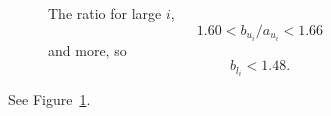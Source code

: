 \documentclass{amsart}
\begin{document}
\begin{figure}
\caption{The ratio for large $i$, $$ 1.60 < b_{u_i}/a_{u_i} < 1.66 $$ and more, so $$ b_{l_i} < 1.48.$$}\label{fig:r}
\end{figure}
See Figure~\ref{fig:r}.
\end{document}
